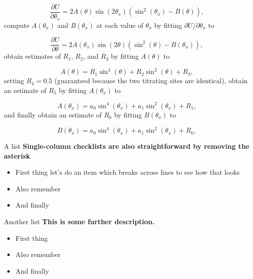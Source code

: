 \documentclass[9pt,tutorial]{livecoms}
\begin{document}
\begin{equation}
    \frac{\partial U}{\partial\theta_{x}}=2A\left(\theta\right)\sin\left(2\theta_{x}\right)\left(\sin^{2}\left(\theta_{x}\right)-B\left(\theta\right)\right),
\end{equation}
compute $A\left(\theta_{x}\right)$ and $B\left(\theta_{x}\right)$ at each value of $\theta_{x}$ by fitting $\partial U/\partial\theta_{x}$ to

\begin{equation}
    \frac{\partial U}{\partial\theta}=2A\left(\theta_{x}\right)\sin\left(2\theta\right)\left(\sin^{2}\left(\theta\right)-B\left(\theta_{x}\right)\right),
\end{equation}
obtain estimates of $R_{1}$, $R_{2}$, and $R_{3}$ by fitting $A\left(\theta\right)$ to

\begin{equation}
    A\left(\theta\right) = R_{1}\sin^{4}\left(\theta\right)+R_{2}\sin^{2}\left(\theta\right)+R_{3},
\end{equation}
setting $R_{4}=0.5$ (guaranteed because the two titrating sites are identical), obtain an estimate of $R_{5}$ by fitting $A\left(\theta_{x}\right)$ to

\begin{equation}
    A\left(\theta_{x}\right)=a_{0}\sin^{4}\left(\theta_{x}\right)+a_{1}\sin^{2}(\theta_{x})+R_{5},
\end{equation}
and finally obtain an estimate of $R_{6}$ by fitting $B\left(\theta_{x}\right)$ to

\begin{equation}
    B\left(\theta_{x}\right)=a_{0}\sin^{4}\left(\theta_{x}\right)+a_{1}\sin^{2}(\theta_{x})+R_{6},
\end{equation}
\begin{Checklists}

\begin{checklist}{A list}
\textbf{Single-column checklists are also straightforward by removing the asterisk}
\begin{itemize}
\item First thing let's do an item which breaks across lines to see how that looks
\item Also remember
\item And finally
\end{itemize}
\end{checklist}

\begin{checklist}{Another list}
\textbf{This is some further description.}
\begin{itemize}
\item First thing
\item Also remember
\item And finally
\end{itemize}
\end{checklist}

\end{Checklists}
\end{document}
